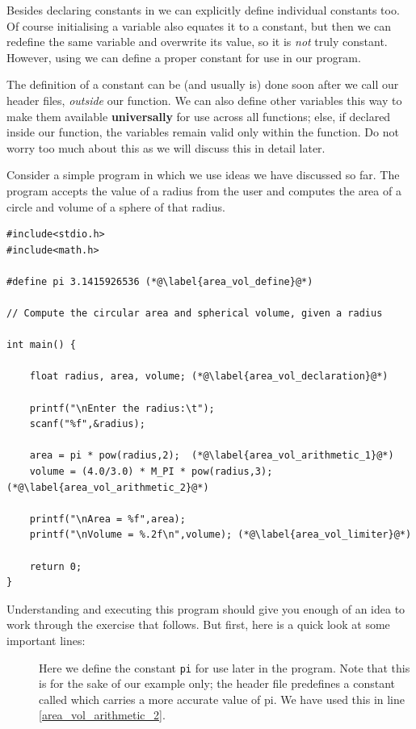 \documentclass[11pt,oneside]{article}
\newcounter{exercise}
\begin{document}
{{{{{{{Besides declaring constants in  we can explicitly define individual constants too. Of course initialising a variable also equates it to a constant, but then we can redefine the same variable and overwrite its value, so it is \textit{not} truly constant. However, using  we can define a proper constant for use in our program.

The definition of a constant can be (and usually is) done soon after we call our header files, \textit{outside} our  function. We can also define other variables this way to make them available \textbf{universally} for use across all functions; else, if declared inside our  function, the variables remain valid only within the  function. Do not worry too much about this as we will discuss this in detail later.

Consider a simple program in which we use ideas we have discussed so far. The program accepts the value of a radius from the user and computes the area of a circle and volume of a sphere of that radius. 

\begin{lstlisting}
#include<stdio.h>
#include<math.h>

#define pi 3.1415926536	(*@\label{area_vol_define}@*)
 
// Compute the circular area and spherical volume, given a radius

int main() {
    
    float radius, area, volume;	(*@\label{area_vol_declaration}@*)
    
    printf("\nEnter the radius:\t");
    scanf("%f",&radius);
    
    area = pi * pow(radius,2);	(*@\label{area_vol_arithmetic_1}@*)
    volume = (4.0/3.0) * M_PI * pow(radius,3);	(*@\label{area_vol_arithmetic_2}@*)
    
    printf("\nArea = %f",area);
    printf("\nVolume = %.2f\n",volume);	(*@\label{area_vol_limiter}@*)
    
    return 0;
}
\end{lstlisting}

Understanding and executing this program should give you enough of an idea to work through the exercise that follows. But first, here is a quick look at some important lines:
\begin{description}
\item[] Here we define the constant \verb+pi+ for use later in the program. Note that this is for the sake of our example only; the  header file predefines a constant called  which carries a more accurate value of pi. We have used this in line \ref{area_vol_arithmetic_2}.


\end{description}}}}}}}}
\end{document}
